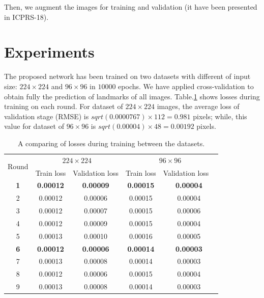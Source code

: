 \documentclass[12pt,a4paper]{article}
\begin{document}
Then, we augment the images for training and validation (it have been presented in ICPRS-18).


\section{Experiments}
The proposed network has been trained on two datasets with different of input size: $224 \times 224$ and $96 \times 96$ in $10000$ epochs. We have applied cross-validation to obtain fully the prediction of landmarks of all images. Table.\ref{tab2} shows losses during training on each round.
For dataset of $224 \times 224$ images, the average loss of validation stage (RMSE) is \textit{$sqrt(0.0000767) \times 112 = 0.981$} pixels; while, this value for dataset of $96 \times 96$ is \textit{$sqrt(0.00004) \times 48 = 0.00192$} pixels.

\begin{table}[htbp]
\centering
\begin{tabular}{ | c | c | c | c | c | }
\hline
	\multicolumn{1}{|c|}{\multirow{2}{*}{Round}} & \multicolumn{2}{c|}{$224 \times 224$} &  \multicolumn{2}{c|}{$96 \times 96$}  \\ \cline{2-5}
	 & Train loss & Validation loss & Train loss & Validation loss \  \\ \hline
	\textbf{1} & \textbf{0.00012} & \textbf{0.00009} & \textbf{0.00015} & \textbf{0.00004} \\ \hline
	2 & 0.00012 & 0.00006 & 0.00015 & 0.00004 \\ \hline
	3 & 0.00012 & 0.00007 & 0.00015 & 0.00006 \\ \hline
	4 & 0.00012 & 0.00009 & 0.00015 & 0.00004 \\ \hline
	5 & 0.00013 & 0.00010 & 0.00016 & 0.00005 \\ \hline
	\textbf{6} & \textbf{0.00012} & \textbf{0.00006} & \textbf{0.00014} & \textbf{0.00003} \\ \hline
	7 & 0.00013 & 0.00008 & 0.00014 & 0.00003 \\ \hline
	8 & 0.00012 & 0.00006 & 0.00015 & 0.00004 \\ \hline
	9 & 0.00013 & 0.00008 & 0.00014 & 0.00003 \\ \hline
\end{tabular}
\caption{\small{A comparing of losses during training between the datasets.}}
\label{tab2}
\end{table}
\end{document}
